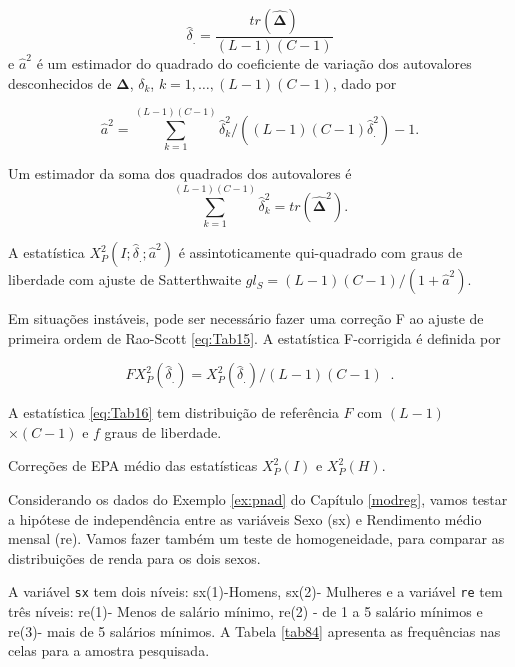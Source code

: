 \documentclass[]{book}
\numberwithin{example}{chapter}
\numberwithin{remark}{chapter}
\numberwithin{definition}{chapter}
\let\BeginKnitrBlock\begin \let\EndKnitrBlock\end
\begin{document}
\[
\hat{\delta}_{.}=\frac{tr\left( \mathbf{\hat{\Delta}}\right) }{\left(
L-1\right) \left( C-1\right) } 
\] e \(\hat{a}^{2}\) é um estimador do quadrado do coeficiente de
variação dos autovalores desconhecidos de \(\mathbf{\Delta}\),
\(\delta _{k}\), \(k=1,\ldots ,\left( L-1\right) \left( C-1\right)\),
dado por

\[
\hat{a}^{2}=\sum\limits_{k=1}^{\left( L-1\right) \left( C-1\right) }\hat{
\delta}_{k}^{2}/\left( \left( L-1\right) \left( C-1\right) \hat{\delta}
_{.}^{2}\right) -1. 
\]

Um estimador da soma dos quadrados dos autovalores é \[
\sum\limits_{k=1}^{\left( L-1\right) \left( C-1\right) }\hat{\delta}
_{k}^{2}=tr\left( \mathbf{\hat{\Delta}}^{2}\right).
\]

A estatística \(X_{P}^{2}\left( I;\hat{\delta}_{.};\hat{a}^{2}\right)\)
é assintoticamente qui-quadrado com graus de liberdade com ajuste de
Satterthwaite
\(gl_{S}=\left( L-1\right) \left( C-1\right) /\left( 1+\hat{a} ^{2}\right) .\)

Em situações instáveis, pode ser necessário fazer uma correção F ao
ajuste de primeira ordem de Rao-Scott \eqref{eq:Tab15}. A estatística
F-corrigida é definida por

\begin{equation}
FX_{P}^{2}\left( \hat{\delta}_{.}\right) =X_{P}^{2}\left( \hat{\delta}
_{.}\right) /\left( L-1\right) \left( C-1\right) \;\;.  \label{eq:Tab16}
\end{equation}

A estatística \eqref{eq:Tab16} tem distribuição de referência \(F\) com
\(\left( L-1\right)\) \(\times\left( C-1\right)\) e \(f\) graus de
liberdade.

\BeginKnitrBlock{example}
\protect\hypertarget{ex:unnamed-chunk-122}{}{\label{ex:unnamed-chunk-122}}Correções
de EPA médio das estatísticas \(X_{P}^{2}\left(I\right)\) e
\(X_{P}^{2}\left(H\right)\).
\EndKnitrBlock{example}

Considerando os dados do Exemplo \ref{ex:pnad} do Capítulo \ref{modreg},
vamos testar a hipótese de independência entre as variáveis Sexo (sx) e
Rendimento médio mensal (re). Vamos fazer também um teste de
homogeneidade, para comparar as distribuições de renda para os dois
sexos.

A variável \texttt{sx} tem dois níveis: sx(1)-Homens, sx(2)- Mulheres e
a variável \texttt{re} tem três níveis: re(1)- Menos de salário mínimo,
re(2) - de 1 a 5 salário mínimos e re(3)- mais de 5 salários mínimos. A
Tabela \ref{tab84} apresenta as frequências nas celas para a amostra
pesquisada.
\end{document}
